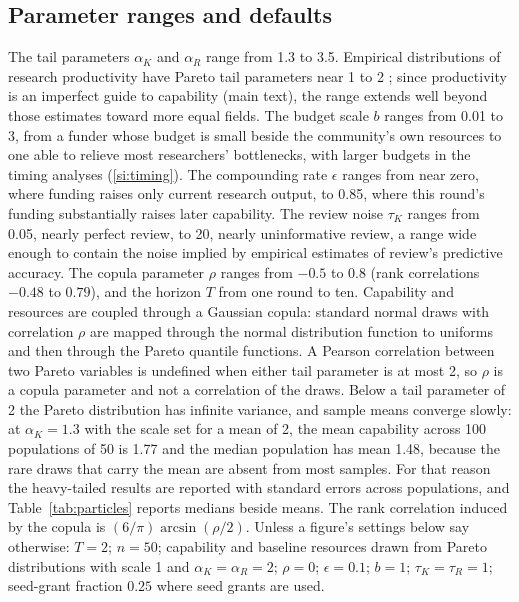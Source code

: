 \subsection*{Parameter ranges and defaults}
The tail parameters $\alpha_K$ and $\alpha_R$ range from 1.3 to 3.5. Empirical distributions of research productivity have Pareto tail parameters near 1 to 2 \citep{Lotka1926, Nicholls1989}; %
since productivity is an imperfect guide to capability (main text), the range extends well beyond those estimates toward more equal fields. The budget scale $b$ ranges from 0.01 to 3, from a funder whose budget is small beside the community's own resources to one able to relieve most researchers' bottlenecks, with larger budgets in the timing analyses (\ref{si:timing}). The compounding rate $\epsilon$ ranges from near zero, where funding raises only current research output, to 0.85, where this round's funding substantially raises later capability. The review noise $\tau_K$ ranges from 0.05, nearly perfect review, to 20, nearly uninformative review, a range wide enough to contain the noise implied by empirical estimates of review's predictive accuracy. The copula parameter $\rho$ ranges from $-0.5$ to 0.8 (rank correlations $-0.48$ to $0.79$), and the horizon $T$ from one round to ten. Capability and resources are coupled through a Gaussian copula: standard normal draws with correlation $\rho$ are mapped through the normal distribution function to uniforms and then through the Pareto quantile functions. A Pearson correlation between two Pareto variables is undefined when either tail parameter is at most 2, so $\rho$ is a copula parameter and not a correlation of the draws. Below a tail parameter of 2 the Pareto distribution has infinite variance, and sample means converge slowly: at $\alpha_K = 1.3$ with the scale set for a mean of 2, the mean capability across 100 populations of 50 is 1.77 and the median population has mean 1.48, because the rare draws that carry the mean are absent from most samples. For that reason the heavy-tailed results are reported with standard errors across populations, and Table~\ref{tab:particles} reports medians beside means. The rank correlation induced by the copula is $(6/\pi)\arcsin(\rho/2)$. Unless a figure's settings below say otherwise: $T = 2$; $n = 50$; capability and baseline resources drawn from Pareto distributions with scale 1 and $\alpha_K = \alpha_R = 2$; $\rho = 0$; $\epsilon = 0.1$; $b = 1$; $\tau_K = \tau_R = 1$; seed-grant fraction $0.25$ where seed grants are used.

